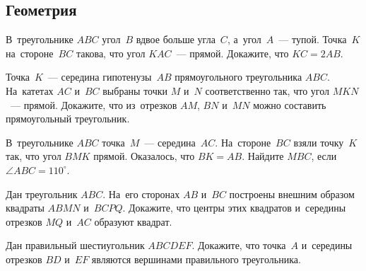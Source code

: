 



\subsection*{Геометрия}

\begin{problems}

\item
В~треугольнике $ABC$ угол~$B$ вдвое больше угла~$C$, а~угол~$A$~--- тупой.
Точка~$K$ на~стороне~$BC$ такова, что угол $KAC$~--- прямой.
Докажите, что $KC = 2 AB$.

\item
Точка~$K$~--- середина гипотенузы~$AB$ прямоугольного треугольника $ABC$.
На~катетах $AC$ и~$BC$ выбраны точки $M$ и~$N$ соответственно так, что
угол $MKN$~--- прямой.
Докажите, что из~отрезков $AM$, $BN$ и~$MN$ можно составить прямоугольный
треугольник.

\item
В~треугольнике $ABC$ точка~$M$~--- середина~$AC$.
На~стороне~$BC$ взяли точку~$K$ так, что угол $BMK$ прямой.
Оказалось, что $BK = AB$.
Найдите $MBC$, если $\angle ABC = 110^{\circ}$.

\item
Дан треугольник $ABC$.
На~его сторонах $AB$ и~$BC$ построены внешним
образом квадраты $ABMN$ и~$BCPQ$.
Докажите, что центры этих квадратов и~середины отрезков $MQ$ и~$AC$ образуют
квадрат.

\item
Дан правильный шестиугольник $ABCDEF$.
Докажите, что точка~$A$ и~середины отрезков $BD$ и~$EF$ являются вершинами
правильного треугольника.



\end{problems}

